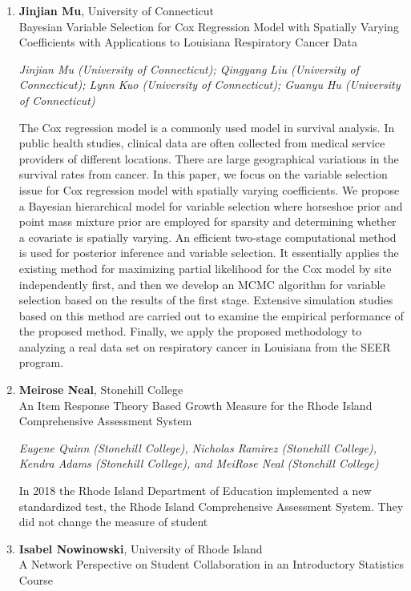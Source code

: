 \begin{enumerate}
\item \textbf{Jinjian Mu}, University of Connecticut \\
Bayesian Variable Selection for Cox Regression Model with Spatially Varying Coefficients with Applications to Louisiana Respiratory Cancer Data

\emph{\footnotesize Jinjian Mu (University of Connecticut); Qingyang Liu (University of Connecticut); Lynn Kuo (University of Connecticut); Guanyu Hu (University of Connecticut)}

The Cox regression model is a commonly used model in survival analysis. In public health studies, clinical data are often collected from medical service providers of different locations. There are large geographical variations in the survival rates from cancer. In this paper, we focus on the variable selection issue for Cox regression model with spatially varying coefficients. We propose a Bayesian hierarchical model for variable selection where horseshoe prior and point mass mixture prior are employed for sparsity and determining whether a covariate is spatially varying. An efficient two-stage computational method is used for posterior inference and variable selection. It essentially applies the existing method for maximizing partial likelihood for the Cox model by site independently first, and then we develop an MCMC algorithm for variable selection based on the results of the first stage. Extensive simulation studies based on this method are carried out to examine the empirical performance of the proposed method. Finally, we apply the proposed methodology to analyzing a real data set on respiratory cancer in Louisiana from the SEER program.

\item \textbf{Meirose Neal}, Stonehill College \\
An Item Response Theory Based Growth Measure for the Rhode Island Comprehensive Assessment System

\emph{\footnotesize Eugene Quinn (Stonehill College), Nicholas Ramirez (Stonehill College), Kendra Adams (Stonehill College), and MeiRose Neal (Stonehill College)}

In 2018 the Rhode Island Department of Education implemented a new standardized test, the Rhode Island Comprehensive Assessment System.  They did not change the measure of student

\item \textbf{Isabel Nowinowski}, University of Rhode Island \\
A Network Perspective on Student Collaboration in an Introductory Statistics Course


\end{enumerate}

